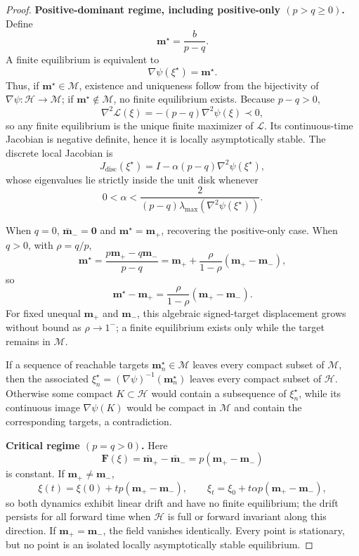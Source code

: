 \documentclass{article}
\theoremstyle{plain}
\theoremstyle{definition}
\theoremstyle{remark}
\begin{document}
\begin{proof}
\textbf{Positive-dominant regime, including positive-only
\((p>q\ge0)\).}
Define
\[
\mathbf m^\star
=
\frac{b}{p-q}.
\]
A finite equilibrium is equivalent to
\[
\nabla\psi(\xi^\star)=\mathbf m^\star.
\]
Thus, if \(\mathbf m^\star\in\mathcal M\), existence and uniqueness
follow from the bijectivity of
\(\nabla\psi:\mathcal H\to\mathcal M\); if
\(\mathbf m^\star\notin\mathcal M\), no finite equilibrium exists.
Because \(p-q>0\),
\[
\nabla^2\mathcal L(\xi)
=
-(p-q)\nabla^2\psi(\xi)
\prec0,
\]
so any finite equilibrium is the unique finite maximizer of
\(\mathcal L\). Its continuous-time Jacobian is negative definite, hence
it is locally asymptotically stable. The discrete local Jacobian is
\[
J_{\mathrm{disc}}(\xi^\star)
=
I-\alpha(p-q)\nabla^2\psi(\xi^\star),
\]
whose eigenvalues lie strictly inside the unit disk whenever
\[
0
<
\alpha
<
\frac{2}{
(p-q)\lambda_{\max}(\nabla^2\psi(\xi^\star))
}.
\]

When \(q=0\),
\(\bar{\mathbf m}_-=\mathbf0\) and
\(\mathbf m^\star=\mathbf m_+\), recovering the positive-only case.
When \(q>0\), with \(\rho=q/p\),
\[
\mathbf m^\star
=
\frac{p\mathbf m_+-q\mathbf m_-}{p-q}
=
\mathbf m_+
+
\frac{\rho}{1-\rho}
(\mathbf m_+-\mathbf m_-),
\]
so
\[
\mathbf m^\star-\mathbf m_+
=
\frac{\rho}{1-\rho}
(\mathbf m_+-\mathbf m_-).
\]
For fixed unequal \(\mathbf m_+\) and \(\mathbf m_-\), this algebraic
signed-target displacement grows without bound as \(\rho\to1^-\); a
finite equilibrium exists only while the target remains in
\(\mathcal M\).

If a sequence of reachable targets
\(\mathbf m_n^\star\in\mathcal M\) leaves every compact subset of
\(\mathcal M\), then the associated
\(\xi_n^\star=(\nabla\psi)^{-1}(\mathbf m_n^\star)\) leaves every compact
subset of \(\mathcal H\). Otherwise some compact
\(K\subset\mathcal H\) would contain a subsequence of
\(\xi_n^\star\), while its continuous image \(\nabla\psi(K)\) would be
compact in \(\mathcal M\) and contain the corresponding targets, a
contradiction.

\medskip
\noindent\textbf{Critical regime \((p=q>0)\).}
Here
\[
\mathbf F(\xi)
=
\bar{\mathbf m}_+-\bar{\mathbf m}_-
=
p(\mathbf m_+-\mathbf m_-)
\]
is constant. If \(\mathbf m_+\ne\mathbf m_-\),
\[
\xi(t)
=
\xi(0)+tp(\mathbf m_+-\mathbf m_-),
\qquad
\xi_t
=
\xi_0+t\alpha p(\mathbf m_+-\mathbf m_-),
\]
so both dynamics exhibit linear drift and have no finite equilibrium;
the drift persists for all forward time when \(\mathcal H\) is full or
forward invariant along this direction. If
\(\mathbf m_+=\mathbf m_-\), the field vanishes identically. Every point
is stationary, but no point is an isolated locally asymptotically stable
equilibrium.


\end{proof}
\end{document}

